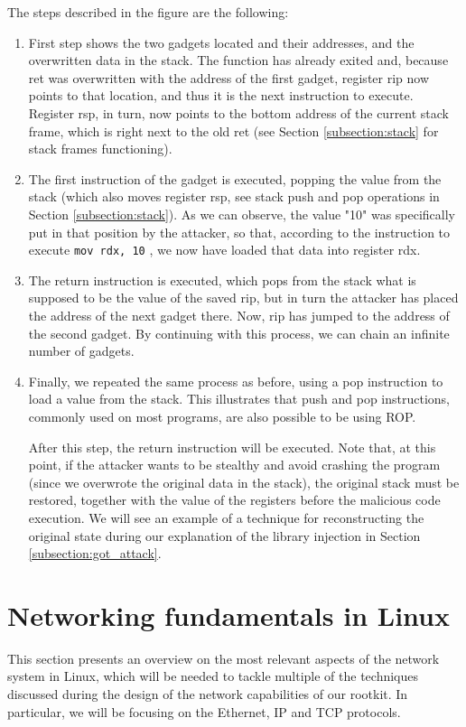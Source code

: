 The steps described in the figure are the following:
\begin{enumerate}
\item First step shows the two gadgets located and their addresses, and the overwritten data in the stack. The function has already exited and, because ret was overwritten with the address of the first gadget, register rip now points to that location, and thus it is the next instruction to execute. Register rsp, in turn, now points to the bottom address of the current stack frame, which is right next to the old ret (see Section \ref{subsection:stack} for stack frames functioning).
\item The first instruction of the gadget is executed, popping the value from the stack (which also moves register rsp, see stack push and pop operations in Section \ref{subsection:stack}). As we can observe, the value "10" was specifically put in that position by the attacker, so that, according to the instruction to execute \lstinline{mov rdx, 10} \lstinline{}, we now have loaded that data into register rdx.
\item The return instruction is executed, which pops from the stack what is supposed to be the value of the saved rip, but in turn the attacker has placed the address of the next gadget there. Now, rip has jumped to the address of the second gadget. By continuing with this process, we can chain an infinite number of gadgets.
\item Finally, we repeated the same process as before, using a pop instruction to load a value from the stack. This illustrates that push and pop instructions, commonly used on most programs, are also possible to be using ROP.

After this step, the return instruction will be executed. Note that, at this point, if the attacker wants to be stealthy and avoid crashing the program (since we overwrote the original data in the stack), the original stack must be restored, together with the value of the registers before the malicious code execution. We will see an example of a technique for reconstructing the original state during our explanation of the library injection in Section \ref{subsection:got_attack}.
\end{enumerate}



\section{Networking fundamentals in Linux} \label{section:networking_fundamentals}
This section presents an overview on the most relevant aspects of the network system in Linux, which will be needed to tackle multiple of the techniques discussed during the design of the network capabilities of our rootkit. In particular, we will be focusing on the Ethernet, IP and TCP protocols.

